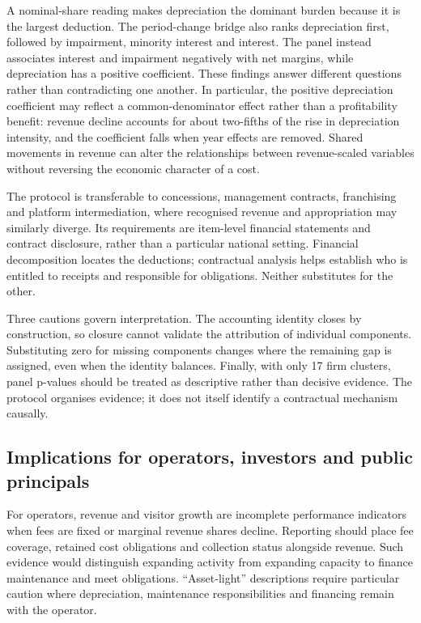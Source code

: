 \documentclass[review,3p,times]{elsarticle}
\begin{document}
A nominal-share reading makes depreciation the dominant burden because it is the largest deduction. The period-change bridge also ranks depreciation first, followed by impairment, minority interest and interest. The panel instead associates interest and impairment negatively with net margins, while depreciation has a positive coefficient. These findings answer different questions rather than contradicting one another. In particular, the positive depreciation coefficient may reflect a common-denominator effect rather than a profitability benefit: revenue decline accounts for about two-fifths of the rise in depreciation intensity, and the coefficient falls when year effects are removed. Shared movements in revenue can alter the relationships between revenue-scaled variables without reversing the economic character of a cost.

The protocol is transferable to concessions, management contracts, franchising and platform intermediation, where recognised revenue and appropriation may similarly diverge. Its requirements are item-level financial statements and contract disclosure, rather than a particular national setting. Financial decomposition locates the deductions; contractual analysis helps establish who is entitled to receipts and responsible for obligations. Neither substitutes for the other.

Three cautions govern interpretation. The accounting identity closes by construction, so closure cannot validate the attribution of individual components. Substituting zero for missing components changes where the remaining gap is assigned, even when the identity balances. Finally, with only 17 firm clusters, panel p-values should be treated as descriptive rather than decisive evidence. The protocol organises evidence; it does not itself identify a contractual mechanism causally.

\subsection{Implications for operators, investors and public principals}

For operators, revenue and visitor growth are incomplete performance indicators when fees are fixed or marginal revenue shares decline. Reporting should place fee coverage, retained cost obligations and collection status alongside revenue. Such evidence would distinguish expanding activity from expanding capacity to finance maintenance and meet obligations. ``Asset-light'' descriptions require particular caution where depreciation, maintenance responsibilities and financing remain with the operator.
\end{document}
